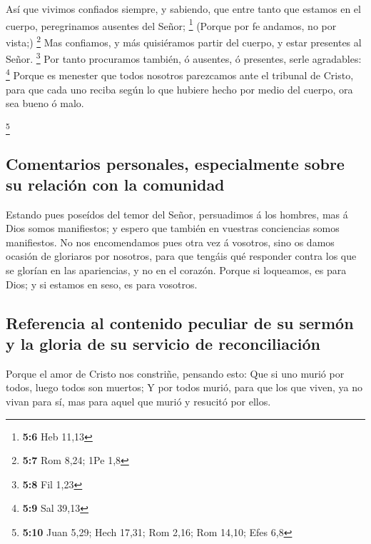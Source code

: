  Así que vivimos confiados siempre, y sabiendo, que entre
tanto que estamos en el cuerpo, peregrinamos ausentes del Señor;
\footnote{\textbf{5:6} Heb 11,13}  (Porque por fe andamos,
no por vista;) \footnote{\textbf{5:7} Rom 8,24; 1Pe 1,8} 
Mas confiamos, y más quisiéramos partir del cuerpo, y estar presentes al
Señor. \footnote{\textbf{5:8} Fil 1,23}  Por tanto
procuramos también, ó ausentes, ó presentes, serle agradables:
\footnote{\textbf{5:9} Sal 39,13}  Porque es menester que
todos nosotros parezcamos ante el tribunal de Cristo, para que cada uno
reciba según lo que hubiere hecho por medio del cuerpo, ora sea bueno ó
malo.

\footnote{\textbf{5:10} Juan 5,29; Hech 17,31; Rom 2,16; Rom 14,10; Efes
  6,8}

\hypertarget{comentarios-personales-especialmente-sobre-su-relaciuxf3n-con-la-comunidad}{%
\subsection{Comentarios personales, especialmente sobre su relación con
la
comunidad}\label{comentarios-personales-especialmente-sobre-su-relaciuxf3n-con-la-comunidad}}

 Estando pues poseídos del temor del Señor, persuadimos á
los hombres, mas á Dios somos manifiestos; y espero que también en
vuestras conciencias somos manifiestos.  No nos
encomendamos pues otra vez á vosotros, sino os damos ocasión de
gloriaros por nosotros, para que tengáis qué responder contra los que se
glorían en las apariencias, y no en el corazón.  Porque
si loqueamos, es para Dios; y si estamos en seso, es para vosotros.

\hypertarget{referencia-al-contenido-peculiar-de-su-sermuxf3n-y-la-gloria-de-su-servicio-de-reconciliaciuxf3n}{%
\subsection{Referencia al contenido peculiar de su sermón y la gloria de
su servicio de
reconciliación}\label{referencia-al-contenido-peculiar-de-su-sermuxf3n-y-la-gloria-de-su-servicio-de-reconciliaciuxf3n}}

 Porque el amor de Cristo nos constriñe, pensando esto:
Que si uno murió por todos, luego todos son muertos;  Y
por todos murió, para que los que viven, ya no vivan para sí, mas para
aquel que murió y resucitó por ellos.

